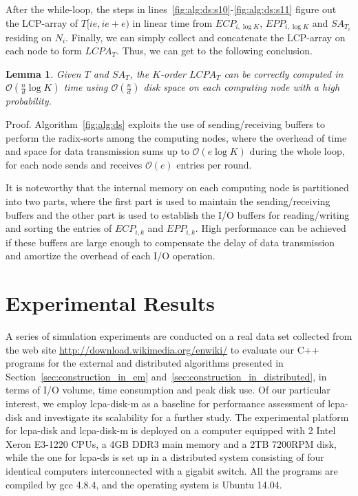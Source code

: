 \documentclass[10pt,journal,compsoc]{IEEEtran}
\newtheorem{Lemma}{Lemma}
\begin{document}
\begin{CJK*}{GBK}{song}
After the while-loop, the steps in lines~\ref{fig:alg:ds:s10}-\ref{fig:alg:ds:s11} figure out the LCP-array of $T[ie,ie+e)$ in linear time from $ECP_{i,{\log K}}$, $EPP_{i,{\log K}}$ and $SA_{T_i}$ residing on $N_i$. Finally, we can simply collect and concatenate the LCP-array on each node to form $LCPA_T$. Thus, we can get to the following conclusion.

\begin{Lemma}
\label{thm:lcp:pdm}
Given $T$ and $SA_T$, the $K$-order $LCPA_T$ can be correctly computed in $\mathcal{O}(\frac{n}{d}\log K)$ time using $\mathcal{O}(\frac{n}{d})$ disk space on each computing node with a high probability.
\end{Lemma}
Proof. Algorithm~\ref{fig:alg:ds} exploits the use of sending/receiving buffers to perform the radix-sorts among the computing nodes, where the overhead of time and space for data transmission sums up to $\mathcal{O}(e\log K)$ during the whole loop, for each node sends and receives $\mathcal{O}(e)$ entries per round.

It is noteworthy that the internal memory on each computing node is partitioned into two parts, where the first part is used to maintain the sending/receiving buffers and the other part is used to establish the I/O buffers for reading/writing and sorting the entries of $ECP_{i,k}$ and $EPP_{i,k}$. High performance can be achieved if these buffers are large enough to compensate the delay of data transmission and amortize the overhead of each I/O operation.


\section{Experimental Results}\label{sec:experimental_results}

A series of simulation experiments are conducted on a real data set collected from the web site \url{http://download.wikimedia.org/enwiki/} to evaluate our {C++} programs for the external and distributed algorithms presented in Section~\ref{sec:construction_in_em} and~\ref{sec:construction_in_distributed}, in terms of I/O volume, time consumption and peak disk use. Of our particular interest, we employ lcpa-disk-m as a baseline for performance assessment of lcpa-disk and investigate its scalability for a further study. The experimental platform for lcpa-disk and lcpa-disk-m is deployed on a computer equipped with 2 Intel Xeron E3-1220 CPUs, a 4GB DDR3 main memory and a 2TB 7200RPM  disk, while the one for lcpa-ds is set up in a distributed system consisting of four identical computers interconnected with a gigabit switch. All the programs are compiled by gcc 4.8.4, and the operating system is Ubuntu 14.04.


\end{CJK*}
\end{document}
